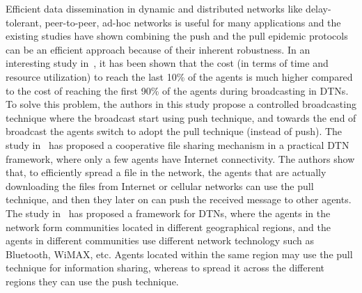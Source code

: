 \noindent

Efficient data dissemination in dynamic and distributed networks like delay-tolerant, peer-to-peer, ad-hoc networks is useful for many applications and the 
existing studies have shown combining the push and the pull epidemic protocols can be 
an efficient approach because of their inherent robustness. 
In an interesting study in~\cite{broadcastCoverage_push_pull}, it has been
shown that the cost (in terms of time and resource utilization) to reach the
last 10\% of the agents is much higher compared to the cost of reaching the
first 90\% of the agents during broadcasting in DTNs. To solve this problem,
the authors in this study propose a controlled broadcasting technique where
the broadcast start using push technique, and towards the end of broadcast
the agents switch to adopt the pull technique (instead of push). 
The study in~\cite{push_pull_contentDistribution} has proposed a cooperative file sharing
mechanism in a practical DTN framework, where only a few agents have
Internet connectivity. 
The authors show that, to efficiently spread a file in
the network, the agents that are actually downloading the files from
Internet or cellular networks can use the pull technique, and then they
later on can push the received message to other agents. 
The study in~\cite{DTN_framework_pushPull} has proposed a framework for DTNs, where
the agents in the network form communities located in different geographical
regions, and the agents in different communities use different network
technology such as Bluetooth, WiMAX, etc. Agents located within the same
region may use the pull technique for information sharing, whereas to spread
it across the different regions they can use the push technique.


